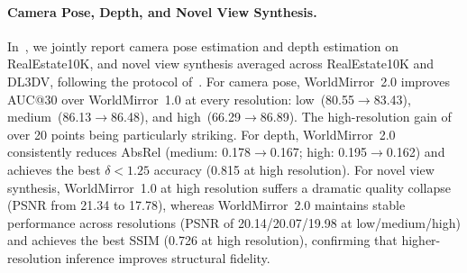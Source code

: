 \documentclass{article} %
\begin{document}
\paragraph{Camera Pose, Depth, and Novel View Synthesis.}
In~, we jointly report camera pose estimation and depth estimation on RealEstate10K, and novel view synthesis averaged across RealEstate10K and DL3DV, following the protocol of~\cite{wang2025pi}. For camera pose, WorldMirror~2.0 improves AUC@30 over WorldMirror~1.0 at every resolution: low~(80.55$\to$83.43), medium~(86.13$\to$86.48), and high~(66.29$\to$86.89). The high-resolution gain of over 20 points being particularly striking. For depth, WorldMirror~2.0 consistently reduces AbsRel (medium: 0.178$\to$0.167; high: 0.195$\to$0.162) and achieves the best $\delta{<}1.25$ accuracy (0.815 at high resolution). For novel view synthesis, WorldMirror~1.0 at high resolution suffers a dramatic quality collapse (PSNR from 21.34 to 17.78), whereas WorldMirror~2.0 maintains stable performance across resolutions (PSNR of 20.14/20.07/19.98 at low/medium/high) and achieves the best SSIM (0.726 at high resolution), confirming that higher-resolution inference improves structural fidelity.

 
\end{document}
